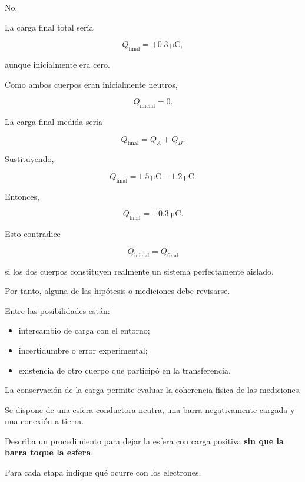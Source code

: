 \begin{respuesta}

No.

La carga final total sería

\[
\boxed{
Q_{\text{final}}=+\SI{0.3}{\micro\coulomb}
},
\]

aunque inicialmente era cero.

\end{respuesta}

\begin{explicacion}

Como ambos cuerpos eran inicialmente neutros,

\[
Q_{\text{inicial}}=0.
\]

La carga final medida sería

\[
Q_{\text{final}}
=
Q_A+Q_B.
\]

Sustituyendo,

\[
Q_{\text{final}}
=
\SI{1.5}{\micro\coulomb}
-\SI{1.2}{\micro\coulomb}.
\]

Entonces,

\[
Q_{\text{final}}
=
+\SI{0.3}{\micro\coulomb}.
\]

Esto contradice

\[
Q_{\text{inicial}}
=
Q_{\text{final}}
\]

si los dos cuerpos constituyen realmente un sistema perfectamente aislado.

Por tanto, alguna de las hipótesis o mediciones debe revisarse.

Entre las posibilidades están:

\begin{itemize}
    \item intercambio de carga con el entorno;
    \item incertidumbre o error experimental;
    \item existencia de otro cuerpo que participó en la transferencia.
\end{itemize}

La conservación de la carga permite evaluar la coherencia física de las
mediciones.

\end{explicacion}



\begin{ejercicio}

Se dispone de una esfera conductora neutra, una barra negativamente cargada y
una conexión a tierra.

Describa un procedimiento para dejar la esfera con carga positiva
\textbf{sin que la barra toque la esfera}.

Para cada etapa indique qué ocurre con los electrones.

\end{ejercicio}

